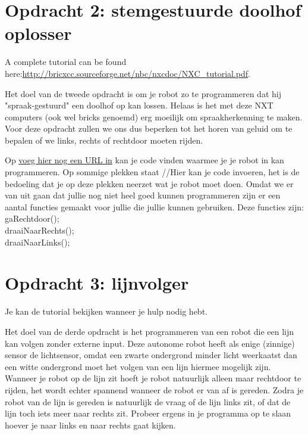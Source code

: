 \documentclass[11pt]{article} %
\begin{document}
\section{Opdracht 2: stemgestuurde doolhof oplosser}

A complete tutorial can be found here:\url{http://bricxcc.sourceforge.net/nbc/nxcdoc/NXC_tutorial.pdf}. 

Het doel van de tweede opdracht is om je robot zo te programmeren dat hij "spraak-gestuurd" een doolhof op kan lossen. 
Helaas is het met deze NXT computers (ook wel bricks genoemd) erg moeilijk om spraakherkenning te maken. 
Voor deze opdracht zullen we ons dus beperken tot het horen van geluid om te bepalen of we links, rechts of rechtdoor moeten rijden. 

Op \url{voeg hier nog een URL in} kan je code vinden waarmee je je robot in kan programmeren. 
Op sommige plekken staat //Hier kan je code invoeren, het is de bedoeling dat je op deze plekken neerzet wat je robot moet doen. 
Omdat we er van uit gaan dat jullie nog niet heel goed kunnen programmeren zijn er een aantal functies gemaakt voor jullie die jullie kunnen gebruiken.
Deze functies zijn: \\
gaRechtdoor();\\
draaiNaarRechts();\\
draaiNaarLinks();\\

\section{Opdracht 3: lijnvolger}
Je kan de tutorial bekijken wanneer je hulp nodig hebt. 

Het doel van de derde opdracht is het programmeren van een robot die een lijn kan volgen zonder externe input.
Deze autonome robot heeft als enige (zinnige) sensor de lichtsensor, omdat een zwarte ondergrond minder licht weerkaatst dan een witte ondergrond moet het volgen van een lijn hiermee mogelijk zijn. 
Wanneer je robot op de lijn zit hoeft je robot natuurlijk alleen maar rechtdoor te rijden, het wordt echter spannend wanneer de robot er van af is gereden. 
Zodra je robot van de lijn is gereden is natuurlijk de vraag of de lijn links zit, of dat de lijn toch iets meer naar rechts zit. 
Probeer ergens in je programma op te slaan hoever je naar links en naar rechts gaat kijken.
\end{document}
